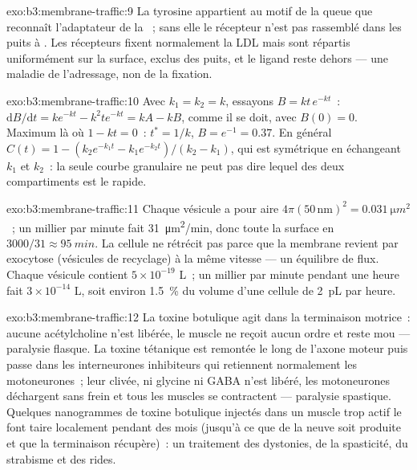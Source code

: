 \begin{solution}{exo:b3:membrane-traffic:9}
La tyrosine appartient au motif de la queue que reconnaît l'adaptateur
de la ~; sans elle le récepteur n'est pas rassemblé dans les
puits à . Les récepteurs fixent normalement la LDL mais sont
répartis uniformément sur la surface, exclus des puits, et le ligand
reste dehors --- une maladie de l'adressage, non de la fixation.
\end{solution}

\begin{solution}{exo:b3:membrane-traffic:10}
Avec $k_{1} = k_{2} = k$, essayons $B = kt\,e^{-kt}$~:
$\mathrm{d}B/\mathrm{d}t
= k e^{-kt} - k^{2}t e^{-kt} = kA - kB$, comme il se doit, avec
$B(0) = 0$. Maximum là où $1 - kt = 0$~: $t^{*} = 1/k$,
$B = e^{-1} = 0.37$. En général
$C(t) = 1 - (k_{2}e^{-k_{1}t} - k_{1}e^{-k_{2}t})/(k_{2} - k_{1})$, qui
est symétrique en échangeant $k_{1}$ et $k_{2}$~: la seule courbe
granulaire ne peut pas dire lequel des deux compartiments est le
rapide.
\end{solution}

\begin{solution}{exo:b3:membrane-traffic:11}
Chaque vésicule a pour aire $4\pi(50\,\text{nm})^{2} = \qty{0.031}{\micro
m^2}$~; un millier par minute fait \qty{31}{\micro m^2/min}, donc toute
la surface en $3000/31 \approx \qty{95}{min}$. La cellule ne rétrécit
pas parce que la membrane revient par exocytose (vésicules de
recyclage) à la même vitesse --- un équilibre de flux. Chaque vésicule
contient $5\times 10^{-19}$ L~; un millier par minute pendant une heure
fait $3\times 10^{-14}$ L, soit environ \qty{1.5}{\%} du volume d'une
cellule de \qty{2}{pL} par heure.
\end{solution}

\begin{solution}{exo:b3:membrane-traffic:12}
La toxine botulique agit dans la terminaison motrice~: aucune
acétylcholine n'est libérée, le muscle ne reçoit aucun ordre et reste
mou --- paralysie flasque. La toxine tétanique est remontée le long de
l'axone moteur puis passe dans les interneurones inhibiteurs qui
retiennent normalement les motoneurones~; leur  clivée, ni glycine
ni GABA n'est libéré, les motoneurones déchargent sans frein et tous
les muscles se contractent --- paralysie spastique. Quelques
nanogrammes de toxine botulique injectés dans un muscle trop actif le
font taire localement pendant des mois (jusqu'à ce que de la 
neuve soit produite et que la terminaison récupère)~: un traitement des
dystonies, de la spasticité, du strabisme et des rides.
\end{solution}

